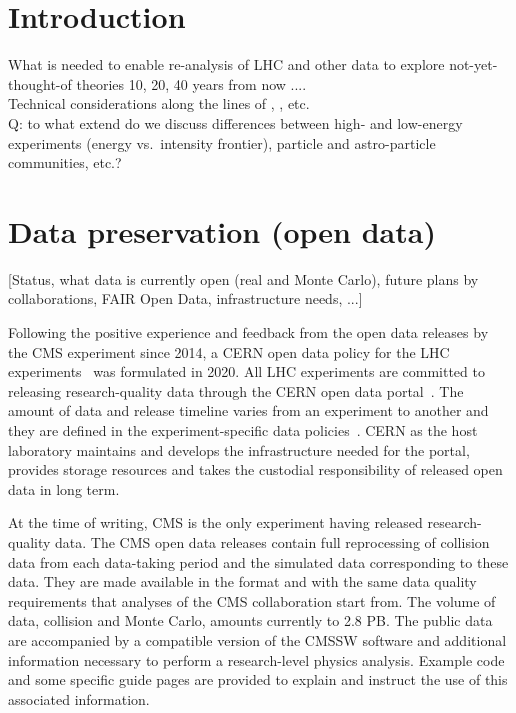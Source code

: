 \documentclass[11pt]{article}
\begin{document}
\clearpage

\section{Introduction}

What is needed to enable re-analysis of LHC and other data to explore not-yet-thought-of theories 10, 20, 40 years from now ....\\
Technical considerations along the lines of \cite{LHCReinterpretationForum:2020xtr},  \cite{Cranmer:2021urp}, etc. \\

Q: to what extend do we discuss differences between high- and low-energy experiments (energy vs.\ intensity frontier), particle and astro-particle communities, etc.? 


\section{Data preservation (open data)}

[Status, what data is currently open (real and Monte Carlo), future plans by collaborations, FAIR Open Data, infrastructure needs, ...]



Following the positive experience and feedback from the open data releases by the CMS experiment since 2014, a CERN open data policy for the LHC experiments~\cite{cern-data-policy} was formulated in 2020. All LHC experiments are committed to releasing research-quality data through the CERN open data portal~\cite{CODP}. The amount of data and release timeline varies from an experiment to another and they are defined in the experiment-specific data policies~\cite{data-policies}. CERN as the host laboratory maintains and develops the infrastructure needed for the portal, provides storage resources and takes the custodial responsibility of released open data in long term. 

At the time of writing, CMS is the only experiment having released research-quality data. The CMS open data releases contain full reprocessing of collision data from each data-taking period and the simulated data corresponding to these data. They are made available in the format and with the same data quality requirements that analyses of the CMS collaboration start from. The volume of data, collision and Monte Carlo, amounts currently to 2.8 PB. The public data are accompanied by a compatible version of the CMSSW software and additional information necessary to perform a research-level physics analysis. Example code and some specific guide pages are provided to explain and instruct the use of this associated information.
\end{document}
